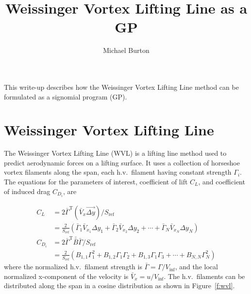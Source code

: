 \documentclass[10pt, a4paper]{article}
\begin{document}
\title{Weissinger Vortex Lifting Line as a GP}
\author{Michael Burton}
\maketitle

This write-up describes how the Weissinger Vortex Lifting Line method can be formulated as a signomial program (GP).  

\section*{Weissinger Vortex Lifting Line}

The Weissinger Vortex Lifting Line (WVL) is a lifting line method used to predict aerodynamic forces on a lifting surface.  It uses a collection of horseshoe vortex filaments along the span, each h.v.\ filament having constant strength $\Gamma_i$. 
The equations for the parameters of interest, coefficient of lift $C_L$, and coefficient of induced drag $C_{D_i}$, are 

\begin{align}
    \label{e:cl}
    C_L &= 2 \bar{\Gamma}^{\mathrm{T}} (\bar{V}_x \vec{\Delta y})/S_{\mathrm{ref}} \\
    &= \frac{2}{S_{\mathrm{ref}}} (\bar{\Gamma}_1 \bar{V}_{x_1} \Delta y_1 + \bar{\Gamma}_2 \bar{V}_{x_2} \Delta y_2 + \cdots + \bar{\Gamma}_N \bar{V}_{x_N} \Delta y_N) \nonumber \\
    \label{e:cdi}
    C_{D_i} &= 2 \bar{\Gamma}^{\mathrm{T}} \bar{\bar{B}} \bar{\Gamma}/S_{\mathrm{ref}} \\
            &= \frac{2}{S_{\mathrm{ref}}} (B_{1,1} \Gamma_1^2 + B_{1,2} \Gamma_1 \Gamma_2 + B_{1,3}\Gamma_1 \Gamma_3 + \cdots + B_{N,N} \Gamma_N^2) \nonumber
\end{align}
where the normalized h.v.\ filament strength is $ \bar{\Gamma} = \Gamma/V_{\inf}$, and the local normalized x-component of the velocity is $\bar{V}_x = u/V_{\inf}$.
The h.v.\ filaments can be distributed along the span in a cosine distribution as shown in Figure~\ref{f:wvl}.  
\end{document}
